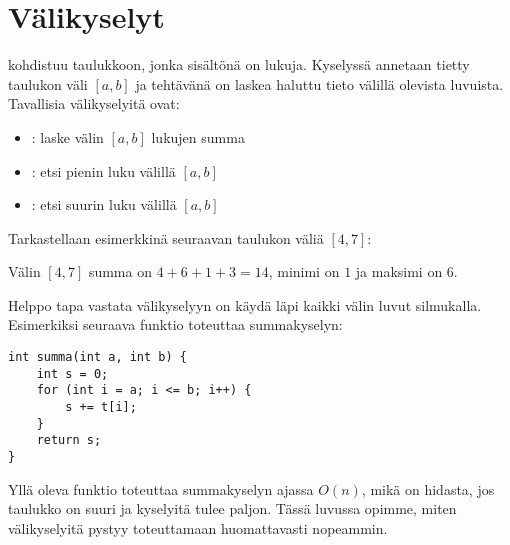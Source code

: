 \chapter{Välikyselyt}


 kohdistuu
taulukkoon, jonka sisältönä on lukuja.
Kyselyssä annetaan tietty taulukon väli $[a,b]$
ja tehtävänä on laskea haluttu tieto välillä olevista luvuista.
Tavallisia välikyselyitä ovat:

\begin{itemize}
\item {}: laske välin $[a,b]$ lukujen summa
\item {}: etsi pienin luku välillä $[a,b]$
\item {}: etsi suurin luku välillä $[a,b]$
\end{itemize}

Tarkastellaan esimerkkinä seuraavan taulukon väliä $[4,7]$:
\begin{center}
\end{center}
Välin $[4,7]$ summa on $4+6+1+3=14$, minimi on $1$
ja maksimi on $6$.

Helppo tapa vastata välikyselyyn on
käydä läpi kaikki välin luvut silmukalla.
Esimerkiksi seuraava funktio toteuttaa summakyselyn:

\begin{lstlisting}
int summa(int a, int b) {
    int s = 0;
    for (int i = a; i <= b; i++) {
        s += t[i];
    }
    return s;
}
\end{lstlisting}

Yllä oleva funktio toteuttaa summakyselyn
ajassa $O(n)$, mikä on hidasta,
jos taulukko on suuri ja kyselyitä tulee paljon.
Tässä luvussa opimme, miten välikyselyitä pystyy
toteuttamaan huomattavasti nopeammin.

